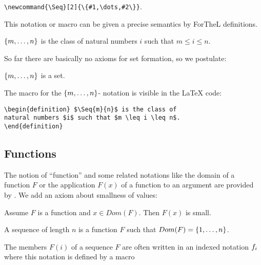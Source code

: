 \documentclass[11pt]{article}
\begin{document}
\verb+\newcommand{\Seq}[2]{\{#1,\dots,#2\}}+.

This notation or macro can be given a precise semantics
by ForTheL definitions.

\begin{forthel}
\begin{definition} $\Seq{m}{n}$ is the class of
natural numbers $i$ such that $m \leq i \leq n$.
\end{definition}
\end{forthel}

So far there are basically no axioms for set formation, so
we postulate:
\begin{forthel}
\begin{axiom} $\Seq{m}{n}$ is a set. \end{axiom}

\end{forthel}

The macro for the $\Seq{m}{n}$- notation is visible in the \LaTeX
code:
\begin{verbatim}
\begin{definition} $\Seq{m}{n}$ is the class of
natural numbers $i$ such that $m \leq i \leq n$.
\end{definition}
\end{verbatim}

\subsection{Functions}

The notion of ``function'' and some related notations like the domain
of a function $F$ or the application $F(x)$ of a function
to an argument are provided by \Naproche.
We add an axiom about smallness of values:

\begin{forthel}

\begin{axiom}
Assume $F$ is a function and $x \in Dom(F)$. Then $F(x)$ is small.
\end{axiom}

\begin{definition} A sequence of length $n$ is a
function $F$ such that $Dom(F) = \Seq{1}{n}$.
\end{definition}

\end{forthel}

The members $F(i)$ of a sequence $F$ are often
written in an indexed notation $f_{i}$
where this notation is defined by a macro
\end{document}
